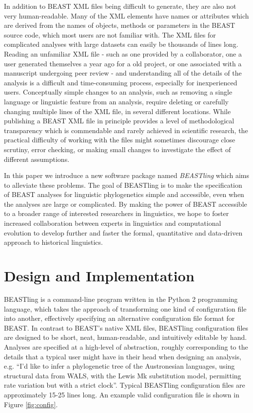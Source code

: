 \documentclass[twocolumn,10pt]{scrartcl}
\begin{document}
In addition to BEAST XML files being difficult to generate, they are also not very human-readable.  Many of the XML elements have names or attributes which are derived from the names of objects, methods or parameters in the BEAST source code, which most users are not familiar with.  The XML files for complicated analyses with large datasets can easily be thousands of lines long.  Reading an unfamiliar XML file - such as one provided by a collaborator, one a user generated themselves a year ago for a old project, or one associated with a manuscript undergoing peer review - and understanding all of the details of the analysis is a difficult and time-consuming process, especially for inexperienced users.  Conceptually simple changes to an analysis, such as removing a single language or linguistic feature from an analysis, require deleting or carefully changing multiple lines of the XML file, in several different locations.  While publishing a BEAST XML file in principle provides a level of methodological transparency which is commendable and rarely achieved in scientific research, the practical difficulty of working with the files might sometimes discourage close scrutiny, error checking, or making small changes to investigate the effect of different assumptions.

In this paper we introduce a new software package named \emph{BEASTling} which aims to alleviate these problems.  The goal of BEASTling is to make the specification of BEAST analyses for linguistic phylogenetics simple and accessible, even when the analyses are large or complicated.  By making the power of BEAST accessible to a broader range of interested researchers in linguistics, we hope to foster increased collaboration between experts in linguistics and computational evolution to develop further and faster the formal, quantitative and data-driven approach to historical linguistics.

\section{Design and Implementation}

BEASTling is a command-line program written in the Python 2 programming language, which takes the approach of transforming one kind of configuration file into another, effectively specifying an alternative configuration file format for BEAST.  In contrast to BEAST's native XML files, BEASTling configuration files are designed to be short, neat, human-readable, and intuitively editable by hand.  Analyses are specified at a high-level of abstraction, roughly corresponding to the details that a typical user might have in their head when designing an analysis, e.g. ``I'd like to infer a phylogenetic tree of the Austronesian languages, using structural data from WALS,  with the Lewis Mk substitution model, permitting rate variation but with a strict clock''.  Typical BEASTling configuration files are approximately 15-25 lines long.  An example valid configuration file is shown in Figure \ref{fig:config}.
\end{document}
